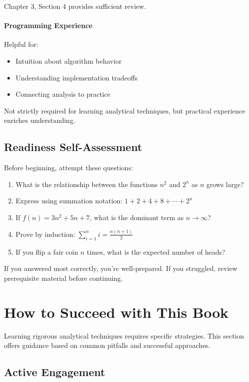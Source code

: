 Chapter 3, Section 4 provides sufficient review.

\paragraph{Programming Experience}
Helpful for:
\begin{itemize}
    \item Intuition about algorithm behavior
    \item Understanding implementation tradeoffs
    \item Connecting analysis to practice
\end{itemize}

Not strictly required for learning analytical techniques, but practical experience enriches understanding.

\subsection{Readiness Self-Assessment}

Before beginning, attempt these questions:

\begin{enumerate}
    \item What is the relationship between the functions $n^2$ and $2^n$ as $n$ grows large?
    \item Express using summation notation: $1 + 2 + 4 + 8 + \cdots + 2^n$
    \item If $f(n) = 3n^2 + 5n + 7$, what is the dominant term as $n \to \infty$?
    \item Prove by induction: $\sum_{i=1}^{n} i = \frac{n(n+1)}{2}$
    \item If you flip a fair coin $n$ times, what is the expected number of heads?
\end{enumerate}
If you answered most correctly, you're well-prepared. If you struggled, review prerequisite material before continuing.

\section{How to Succeed with This Book}

Learning rigorous analytical techniques requires specific strategies. This section offers guidance based on common pitfalls and successful approaches.

\subsection{Active Engagement}

